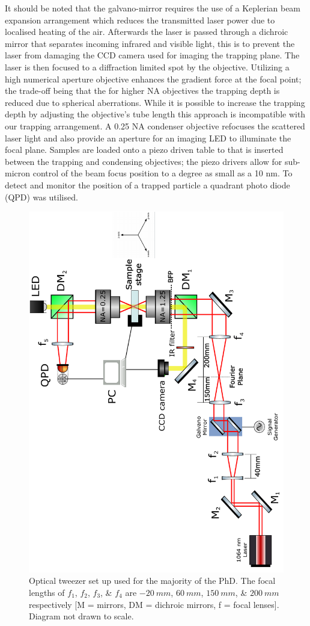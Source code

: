 It should be noted that the galvano-mirror requires the use of a 
Keplerian beam expansion arrangement which reduces the transmitted 
laser power due to localised heating of the air. Afterwards the 
laser is passed through a dichroic mirror that separates incoming 
infrared and visible light, this is to prevent the laser from 
damaging the CCD camera used for imaging the trapping plane. The 
laser is then focused to a diffraction limited spot by the objective. 
Utilizing a high numerical aperture objective enhances the gradient 
force at the focal point; the trade-off being that the for higher NA 
objectives the trapping depth is reduced due to spherical aberrations. 
While it is possible to increase the trapping depth \cite{Reihani2006} 
by adjusting the objective's tube length this approach is incompatible 
with our trapping arrangement. A 0.25 NA condenser objective refocuses 
the scattered laser light and also provide an aperture for an imaging 
LED to illuminate the focal plane. Samples are loaded onto a piezo 
driven table to that is inserted between the trapping and condensing 
objectives; the piezo drivers allow for sub-micron control of the 
beam focus position to a degree as small as a 10 nm. To detect and 
monitor the position of a trapped particle a quadrant photo diode 
(QPD) was utilised. 
\begin{figure}[h!]
	\centering
	\includegraphics[height=\linewidth, angle=270]{tweezer_setup.pdf}
	\caption{Optical tweezer set up used for the majority of the PhD. 
		The focal lengths of $f_1$, $f_2$, $f_3$, \& $f_4$ are $-20\ mm$, 
		$60\ mm$, $150\ mm$, \& $200\ mm$ respectively [M = mirrors,
		DM = dichroic mirrors, f = focal lenses]. Diagram not 
		drawn to scale.}
	\label{fig:setup}
\end{figure}


